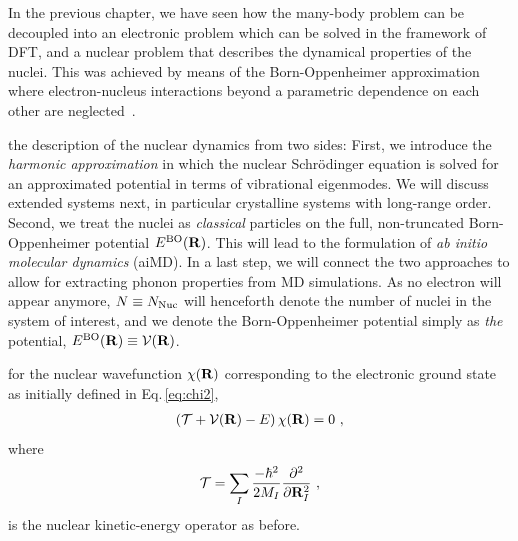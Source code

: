 \label{chp:dynamics}
In the previous chapter, we have seen how the many-body problem can be decoupled into an electronic problem %
which can be solved in the framework of DFT, and a nuclear problem %
that describes the dynamical properties of the nuclei. This was achieved by means of the Born-Oppenheimer approximation where electron-nucleus interactions beyond a parametric dependence on each other are neglected~\cite{BornOppenheimer}.

 the description of the nuclear dynamics from two sides: First, we introduce the \emph{harmonic approximation} in which the nuclear Schr\"odinger equation is solved for an approximated potential in terms of vibrational eigenmodes. We will discuss extended systems next, in particular crystalline systems with long-range order.
Second, we treat the nuclei as \emph{classical} particles on the full, non-truncated Born-Oppenheimer potential $E^{\rm BO} ({\bf R})$. This will lead to the formulation of \emph{ab initio molecular dynamics} (aiMD). In a last step, we will connect the two approaches to allow for extracting phonon properties from MD simulations.
As no electron will appear anymore, $N \equiv N_{\rm Nuc}$ will henceforth denote the number of nuclei in the system of interest, and we denote the Born-Oppenheimer potential simply as \emph{the} potential, $E^{\rm BO} ({\bf R}) \equiv \mathcal V ({\bf R})$.

 for the nuclear wavefunction $\chi ({\bf R})$ corresponding to the electronic ground state as initially defined in Eq.\,\eqref{eq:chi2},
\begin{align}
\left( \mathcal T + \mathcal V ({\bf R}) - E \right) \chi ({\bf R})
= 0~,
\label{eq:BOSE}
\end{align}
where
\begin{align}
\mathcal  T
= \sum_I \frac{- \hbar^2}{2 M_I} \frac{\partial^2}{\partial {\bf R}_I^2}~,
\label{eq:Tnuc2}
\end{align}
is the nuclear kinetic-energy operator as before.

\newpage
